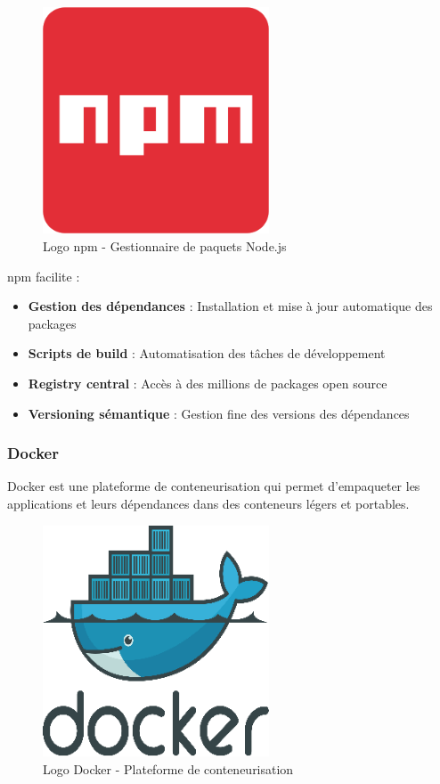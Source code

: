 \documentclass[12pt,a4paper]{report}
\begin{document}
\begin{figure}[htbp]
    \centering
    \includegraphics[width=0.6\textwidth]{latex_media/media/npm.png}
    \caption{Logo npm - Gestionnaire de paquets Node.js}
    \label{fig:npm-logo}
\end{figure}

npm facilite :
\begin{itemize}
    \item \textbf{Gestion des dépendances} : Installation et mise à jour automatique des packages
    \item \textbf{Scripts de build} : Automatisation des tâches de développement
    \item \textbf{Registry central} : Accès à des millions de packages open source
    \item \textbf{Versioning sémantique} : Gestion fine des versions des dépendances
\end{itemize}

\subsubsection{Docker}

Docker est une plateforme de conteneurisation qui permet d'empaqueter les applications et leurs dépendances dans des conteneurs légers et portables.

\begin{figure}[htbp]
    \centering
    \includegraphics[width=0.6\textwidth]{latex_media/media/docker.png}
    \caption{Logo Docker - Plateforme de conteneurisation}
    \label{fig:docker-logo}
\end{figure}
\end{document}
